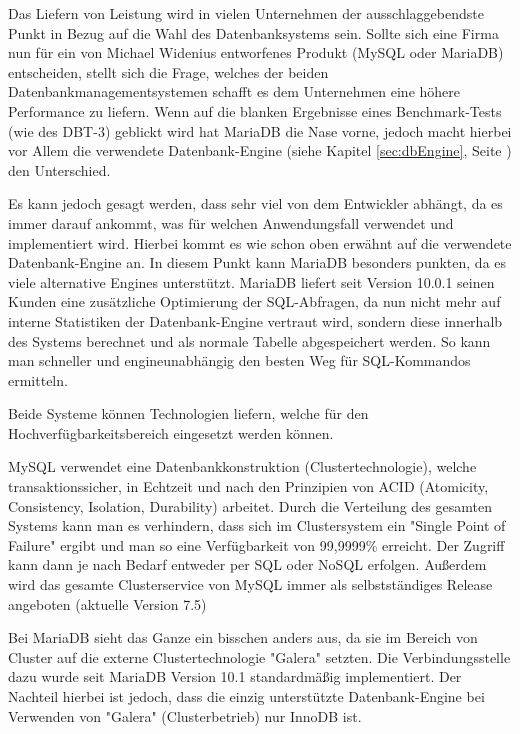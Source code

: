 
Das Liefern von Leistung wird in vielen Unternehmen der ausschlaggebendste Punkt in Bezug auf die Wahl des Datenbanksystems sein. Sollte sich eine Firma nun für ein von Michael Widenius entworfenes Produkt (MySQL oder MariaDB) entscheiden, stellt sich die Frage, welches der beiden Datenbankmanagementsystemen schafft es dem Unternehmen eine höhere Performance zu liefern. Wenn auf die blanken Ergebnisse eines Benchmark-Tests (wie des DBT-3) geblickt wird hat MariaDB die Nase vorne, jedoch macht hierbei vor Allem die verwendete Datenbank-Engine (siehe Kapitel \ref{sec:dbEngine}, Seite \pageref{sec:dbEngine}) den Unterschied. \cite{MariaVsMy}

Es kann jedoch gesagt werden, dass sehr viel von dem Entwickler abhängt, da es immer darauf ankommt, was für welchen Anwendungsfall verwendet und implementiert wird. Hierbei kommt es wie schon oben erwähnt auf die verwendete Datenbank-Engine an. In diesem Punkt kann MariaDB besonders punkten, da es viele alternative Engines unterstützt. MariaDB liefert seit Version 10.0.1 seinen Kunden eine zusätzliche Optimierung der SQL-Abfragen, da nun nicht mehr auf interne Statistiken der Datenbank-Engine vertraut wird, sondern diese innerhalb des Systems berechnet und als normale Tabelle abgespeichert werden. So kann man schneller und engineunabhängig den besten Weg für SQL-Kommandos ermitteln. \cite{MariaVsMy}


Beide Systeme können Technologien liefern, welche für den Hochverfügbarkeitsbereich eingesetzt werden können.

MySQL verwendet eine Datenbankkonstruktion (Clustertechnologie), welche transaktionssicher, in Echtzeit und nach den Prinzipien von ACID (Atomicity, Consistency, Isolation, Durability) arbeitet. Durch die Verteilung des gesamten Systems kann man es verhindern, dass sich im Clustersystem ein "Single Point of Failure" ergibt und man so eine Verfügbarkeit von 99,9999\% erreicht. Der Zugriff kann dann je nach Bedarf entweder per SQL oder NoSQL erfolgen. Außerdem wird das gesamte Clusterservice von MySQL immer als selbstständiges Release angeboten (aktuelle Version 7.5) \cite{MariaVsMy}

Bei MariaDB sieht das Ganze ein bisschen anders aus, da sie im Bereich von Cluster auf die externe Clustertechnologie "Galera" setzten. Die Verbindungsstelle dazu wurde seit MariaDB Version 10.1 standardmäßig implementiert. Der Nachteil hierbei ist jedoch, dass die einzig unterstützte Datenbank-Engine bei Verwenden von "Galera" (Clusterbetrieb) nur InnoDB ist. \cite{MariaVsMy}

